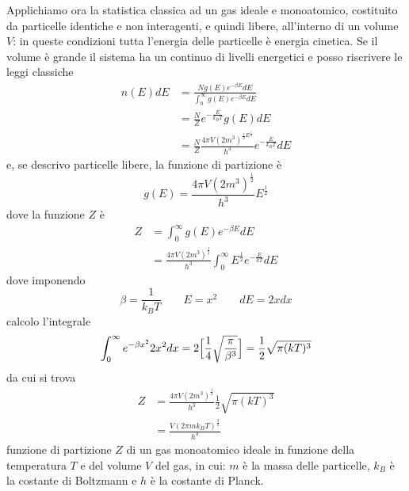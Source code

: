 Applichiamo ora la statistica classica ad un gas ideale e monoatomico, costituito da particelle identiche e non interagenti, e quindi libere, all'interno di un volume $V$: in queste condizioni tutta l'energia delle particelle è energia cinetica.
Se il volume è grande il sistema ha un continuo di livelli energetici e posso riscrivere le leggi classiche
\begin{equation}
\begin{split}
n(E)dE & = \frac{N g(E) e^{-\beta E} dE}{\int_0^\infty g(E) e^{-\beta E} dE } \\
& = \frac{N}{Z} e^{ -\frac{E}{k_B T} } g(E) dE \\
& = \frac{N}{Z} \frac{4\pi V (2m^3)^{ \frac{1}{2} E^{ \frac{1}{2} } }}{h^3} e^{ -\frac{E}{k_B T} }dE
\label{numero_particelle}
\end{split}
\end{equation}
e, se descrivo particelle libere, la funzione di partizione è
\begin{equation}
g(E) = \frac{4 \pi V (2m^3)^{ \frac{1}{2} }}{h^3} E^{ \frac{1}{2} }
\end{equation}
dove la funzione $Z$ è
\begin{equation}
\begin{split}
Z & = \int_0^{\infty} g(E) e^{ -\beta E } dE \\
& = \frac{4\pi V (2m^3)^{\frac{1}{2}}}{h^3} \int_0^{\infty} E^{ \frac{1}{2} } e^{-\frac{E}{kT} } dE
\end{split}
\end{equation}
dove imponendo
\begin{equation}
\beta = \frac{1}{k_B T} \quad\quad E = x^2 \quad\quad dE=2x dx
\end{equation}
calcolo l'integrale
\begin{equation}
\int_0^{\infty} e^{ -\beta x^2 } 2 x^2 dx = 2 \Bigl[  \frac{1}{4} \sqrt{\frac{\pi}{\beta^3}}  \Bigr] = \frac{1}{2} \sqrt{\pi (kT)^3}
\end{equation}
da cui si trova
\begin{equation}
\begin{split}
Z &= \frac{4\pi V (2m^3)^{\frac{1}{2}}}{h^3} \frac{1}{2} \sqrt{\pi (kT)^3} \\
& = \frac{V (2\pi m k_B T)^{ \frac{3}{2} }}{h^3}
\label{funzione_partizione_gasmono}
\end{split}
\end{equation}
funzione di partizione $Z$ di un gas monoatomico ideale in funzione della temperatura $T$ e del volume $V$ del gas, 
in cui: $m$ è la massa delle particelle, $k_B$ è la costante di Boltzmann e $h$ è la costante di Planck.
